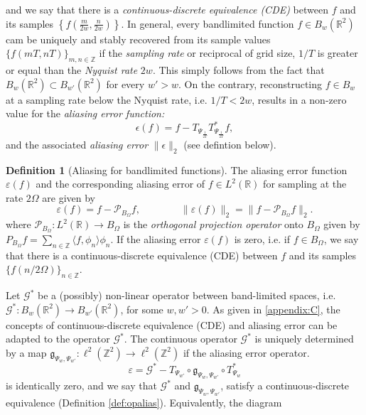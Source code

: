 \documentclass[reqno,10pt]{amsart}
\theoremstyle{plain}
\theoremstyle{definition}
\newtheorem{defn}{Definition}
\newcommand{\bb}[1]{\mathbb{#1}}
\newcommand{\cal}[1]{\mathcal{#1}}
\begin{document}
    and we say that there is a {\it continuous-discrete equivalence (CDE)} between $f$ and its samples $\left\{f\left(\frac{m}{2w},\frac{n}{2w}\right)\right\}$. In general, every bandlimited function $f \in B_w(\bb R^2)$ cam be uniquely and stably recovered from its sample values $\{f(mT,nT)\}_{m,n\in\bb Z}$ if the {\it sampling rate} or reciprocal of grid size, $1/T$ is greater or equal than the {\it Nyquist rate} $2w$. This simply follows from the fact that $B_w(\bb R^2) \subset B_{w'}(\bb R^2)$ for every $w' > w$. On the contrary, reconstructing $f \in B_w$ at a sampling rate below the Nyquist rate, i.e. $1/T < 2w$, results in a non-zero value for the {\it aliasing error function:}
    $$ \epsilon(f) = f - T_{{\Psi}_{\frac{1}{2T}}} T^*_{{\Psi}_{\frac{1}{2T}}}f,$$
    and the associated {\it aliasing error} $\|\epsilon\|_2$  (see defintion below).
    \begin{defn}[Aliasing for bandlimited functions]
        The aliasing error function $\varepsilon(f)$ and the corresponding aliasing error of $f \in L^2(\bb R)$ for sampling at the rate $2\Omega$ are given by
        $$ \varepsilon(f) = f - \cal P_{B_\Omega}f, \qquad\qquad \|\varepsilon(f)\|_2 = \|f - \cal P_{B_\Omega}f\|_2.$$
        where $\cal P_{B_\Omega} : L^2(\bb R) \to B_\Omega$ is the {\it orthogonal projection operator} onto $B_\Omega$ given by $P_{B_\Omega}f = \sum_{n\in \bb Z}\langle f,\phi_n\rangle\phi_n$. If the aliasing error $\varepsilon(f)$ is zero, i.e. if $f \in B_\Omega$, we say that there is a continuous-discrete equivalence (CDE) between $f$ and its samples $\{f(n/2\Omega)\}_{n \in \bb Z}$.
    \end{defn}
    \noindent Let $\cal G^*$ be a (possibly) non-linear operator between band-limited spaces, i.e. $\cal G^* :B_w(\bb R^2) \to B_{w'}(\bb R^2)$, for some $w,w' > 0$. As given in \ref{appendix:C}, the concepts of continuous-discrete equivalence (CDE) and aliasing error can be adapted to the operator $\cal G^*$. The continuous operator $\cal G^*$ is uniquely determined by a map $\mathfrak{g}_{\Psi_w, \Psi_{w'}}:\ell^2(\bb Z^2) \to \ell^2(\bb Z^2)$ if the aliasing error operator.
    \begin{equation}\label{eq:opaliaserror}
        \varepsilon = \cal G^* - T_{\Psi_{w'}} \circ \mathfrak{g}_{\Psi_w, \Psi_{w'}} \circ T^*_{\Psi_w}
    \end{equation}
    is identically zero, and we say that $\cal G^*$ and $\mathfrak{g}_{\Psi_w, \Psi_{w'}}$, satisfy a continuous-discrete equivalence (Definition \ref{def:opalias}). Equivalently, the diagram 
\end{document}
